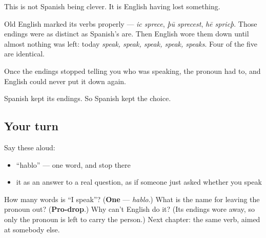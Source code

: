 \begin{cousinweb}
This is not Spanish being clever. It is English having lost something.

Old English marked its verbs properly — \emph{ic sprece}, \emph{þū sprecest}, \emph{hē spricþ}. Those endings were as distinct as Spanish's are. Then English wore them down until almost nothing was left: today \emph{speak, speak, speak, speak, speaks}. Four of the five are identical.

Once the endings stopped telling you who was speaking, the pronoun had to, and English could never put it down again.

Spanish kept its endings. So Spanish kept the choice.
\end{cousinweb}

\subsection*{Your turn}
Say these aloud:

\begin{itemize}
\raggedright
  \item \textquotedblleft{}hablo\textquotedblright{} — one word, and stop there
  \item it as an answer to a real question, as if someone just asked whether you speak
\end{itemize}

\begin{tcolorbox}[breakable,colback=teal!4,colframe=teal!35!black,title={Before you move on}]
How many words is \textquotedblleft{}I speak\textquotedblright{}? (\textbf{One} — \emph{hablo}.) What is the name for leaving the pronoun out? (\textbf{Pro-drop}.) Why can't English do it? (Its endings wore away, so only the pronoun is left to carry the person.) Next chapter: the same verb, aimed at somebody else.
\end{tcolorbox}
